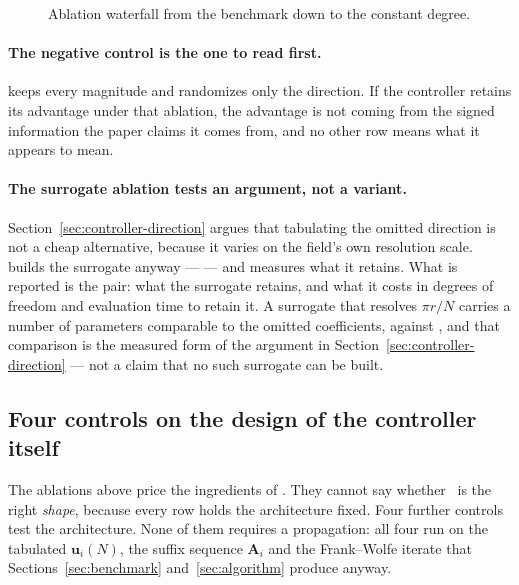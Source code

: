 \begin{figure}[!tbp]
  \centering
  \caption{Ablation waterfall from the benchmark down to the constant degree.}
  \label{fig:waterfall}
\end{figure}

\paragraph{The negative control is the one to read first.} 
keeps every magnitude and randomizes only the direction. If the controller
retains its advantage under that ablation, the advantage is not coming from the
signed information the paper claims it comes from, and no other row means what
it appears to mean. 

\paragraph{The surrogate ablation tests an argument, not a variant.}
Section~\ref{sec:controller-direction} argues that tabulating the omitted
direction is not a cheap alternative, because it varies on the field's own
resolution scale.
 builds the surrogate anyway ---  --- and measures what it retains.  What is
reported is the pair: what the surrogate retains, and what it costs in degrees
of freedom and evaluation time to retain it. A surrogate that resolves
$\pi r/N$ carries a number of parameters comparable to the omitted
coefficients,  against , and that comparison is the
measured form of the argument in Section~\ref{sec:controller-direction} --- not
a claim that no such surrogate can be built.

\subsection{Four controls on the design of the controller itself}
\label{sec:ablations-design}

The ablations above price the ingredients of \Cplan. They cannot say whether
\Cplan\ is the right \emph{shape}, because every row holds the architecture
fixed. Four further controls test the architecture. None of them requires a
propagation: all four run on the tabulated $\mathbf u_i(N)$, the suffix
sequence $\mathbf A_i$ and the Frank--Wolfe iterate that
Sections~\ref{sec:benchmark} and~\ref{sec:algorithm} produce anyway.

